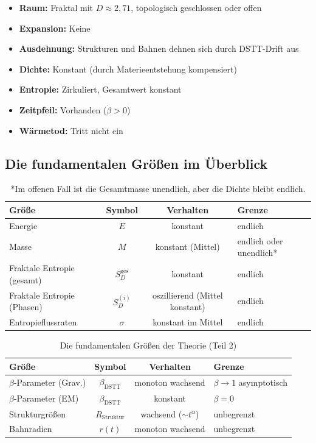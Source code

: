 \documentclass[12pt,a4paper]{article}
\begin{document}
\begin{itemize}
    \item \textbf{Raum:} Fraktal mit $D \approx 2,71$, topologisch geschlossen oder offen
    \item \textbf{Expansion:} Keine
    \item \textbf{Ausdehnung:} Strukturen und Bahnen dehnen sich durch DSTT-Drift aus
    \item \textbf{Dichte:} Konstant (durch Materieentstehung kompensiert)
    \item \textbf{Entropie:} Zirkuliert, Gesamtwert konstant
    \item \textbf{Zeitpfeil:} Vorhanden ($\dot{\beta}>0$)
    \item \textbf{Wärmetod:} Tritt nicht ein
\end{itemize}

\subsection{Die fundamentalen Größen im Überblick}

\begin{table}[ht]
\centering
\caption{Die fundamentalen Größen der Theorie (Teil 1)}
\begin{tabular}{|l|c|c|p{3cm}|}
\hline
\textbf{Größe} & \textbf{Symbol} & \textbf{Verhalten} & \textbf{Grenze} \\ \hline
Energie & $E$ & konstant & endlich \\ \hline
Masse & $M$ & konstant (Mittel) & endlich oder unendlich* \\ \hline
Fraktale Entropie (gesamt) & $S_D^{\text{ges}}$ & konstant & endlich \\ \hline
Fraktale Entropie (Phasen) & $S_D^{(i)}$ & oszillierend (Mittel konstant) & endlich \\ \hline
Entropieflussraten & $\sigma$ & konstant im Mittel & endlich \\ \hline
\end{tabular}
\caption*{*Im offenen Fall ist die Gesamtmasse unendlich, aber die Dichte bleibt endlich.}
\end{table}

\begin{table}[ht]
\centering
\caption{Die fundamentalen Größen der Theorie (Teil 2)}
\begin{tabular}{|l|c|c|p{3cm}|}
\hline
\textbf{Größe} & \textbf{Symbol} & \textbf{Verhalten} & \textbf{Grenze} \\ \hline
$\beta$-Parameter (Grav.) & $\beta_{\text{DSTT}}$ & monoton wachsend & $\beta \to 1$ asymptotisch \\ \hline
$\beta$-Parameter (EM) & $\beta_{\text{DSTT}}$ & konstant & $\beta = 0$ \\ \hline
Strukturgrößen & $R_{\text{Struktur}}$ & wachsend ($\sim t^{\alpha}$) & unbegrenzt \\ \hline
Bahnradien & $r(t)$ & monoton wachsend & unbegrenzt \\ \hline
\end{tabular}
\end{table}
\end{document}
